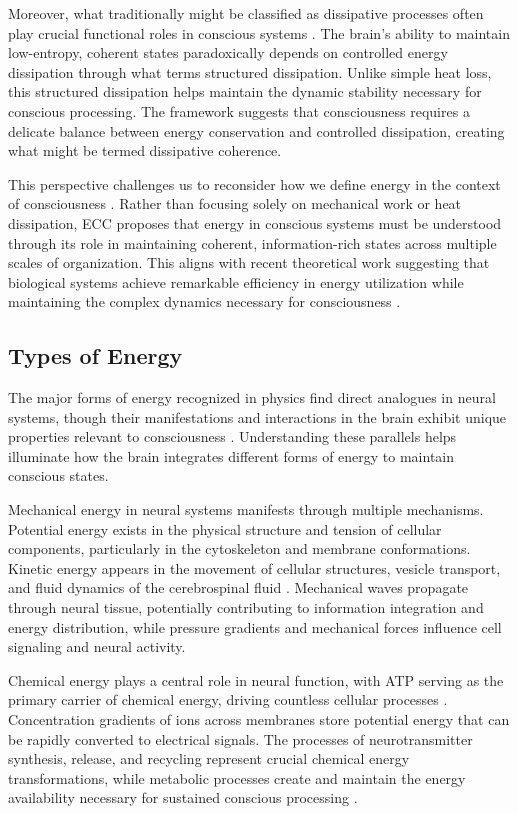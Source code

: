 \begin{refsection}
Moreover, what traditionally might be classified as dissipative processes often play crucial functional roles in conscious systems \cite{Nicolis1977}. The brain's ability to maintain low-entropy, coherent states paradoxically depends on controlled energy dissipation through what \cite{Prigogine1978} terms structured dissipation. Unlike simple heat loss, this structured dissipation helps maintain the dynamic stability necessary for conscious processing. The framework suggests that consciousness requires a delicate balance between energy conservation and controlled dissipation, creating what might be termed dissipative coherence.

This perspective challenges us to reconsider how we define energy in the context of consciousness \cite{Demetrius2015}. Rather than focusing solely on mechanical work or heat dissipation, ECC proposes that energy in conscious systems must be understood through its role in maintaining coherent, information-rich states across multiple scales of organization. This aligns with recent theoretical work suggesting that biological systems achieve remarkable efficiency in energy utilization while maintaining the complex dynamics necessary for consciousness \cite{Laughlin2005}.

\subsection{Types of Energy}

The major forms of energy recognized in physics find direct analogues in neural systems, though their manifestations and interactions in the brain exhibit unique properties relevant to consciousness \cite{Atkins2010}. Understanding these parallels helps illuminate how the brain integrates different forms of energy to maintain conscious states.

Mechanical energy in neural systems manifests through multiple mechanisms. Potential energy exists in the physical structure and tension of cellular components, particularly in the cytoskeleton and membrane conformations. Kinetic energy appears in the movement of cellular structures, vesicle transport, and fluid dynamics of the cerebrospinal fluid \cite{Shulman2013}. Mechanical waves propagate through neural tissue, potentially contributing to information integration and energy distribution, while pressure gradients and mechanical forces influence cell signaling and neural activity.

Chemical energy plays a central role in neural function, with ATP serving as the primary carrier of chemical energy, driving countless cellular processes \cite{Qian2007}. Concentration gradients of ions across membranes store potential energy that can be rapidly converted to electrical signals. The processes of neurotransmitter synthesis, release, and recycling represent crucial chemical energy transformations, while metabolic processes create and maintain the energy availability necessary for sustained conscious processing \cite{Demetrius2015}.


\end{refsection}

